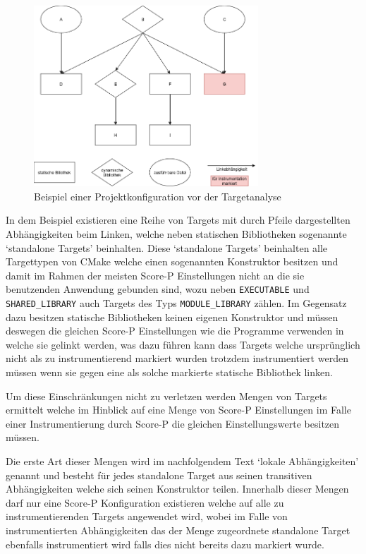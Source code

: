 \documentclass[german,proseminar,hyperref,utf8,lof]{zihpub}
\begin{document}
    \begin{figure}
        \begin{center}
            \includegraphics[width=0.75\textwidth]{analysis_before.drawio.png}
            \caption{Beispiel einer Projektkonfiguration vor der Targetanalyse}
            \label{fig:analysis_before}
        \end{center}
    \end{figure}

    In dem Beispiel existieren eine Reihe von Targets mit durch Pfeile dargestellten Abhängigkeiten
    beim Linken, welche neben statischen Bibliotheken sogenannte `standalone Targets' beinhalten.
    Diese `standalone Targets' beinhalten alle Targettypen von CMake welche einen sogenannten
    Konstruktor besitzen und damit im Rahmen der meisten Score-P Einstellungen nicht an die
    sie benutzenden Anwendung gebunden sind, wozu neben \texttt{EXECUTABLE} und \texttt{SHARED\_LIBRARY}
    auch Targets des Typs \texttt{MODULE\_LIBRARY} zählen.
    Im Gegensatz dazu besitzen statische Bibliotheken keinen eigenen Konstruktor und müssen deswegen
    die gleichen Score-P Einstellungen wie die Programme verwenden in welche sie gelinkt werden, was
    dazu führen kann dass Targets welche ursprünglich nicht als zu instrumentierend markiert wurden
    trotzdem instrumentiert werden müssen wenn sie gegen eine als solche markierte statische
    Bibliothek linken.

    Um diese Einschränkungen nicht zu verletzen werden Mengen von Targets ermittelt welche im
    Hinblick auf eine Menge von Score-P Einstellungen im Falle einer Instrumentierung durch
    Score-P die gleichen Einstellungswerte besitzen müssen.

    Die erste Art dieser Mengen wird im nachfolgendem Text `lokale Abhängigkeiten' genannt und
    besteht für jedes standalone Target aus seinen transitiven Abhängigkeiten welche sich
    seinen Konstruktor teilen.
    Innerhalb dieser Mengen darf nur eine Score-P Konfiguration existieren welche auf alle zu
    instrumentierenden Targets angewendet wird, wobei im Falle von instrumentierten Abhängigkeiten
    das der Menge zugeordnete standalone Target ebenfalls instrumentiert wird falls dies nicht
    bereits dazu markiert wurde.
\end{document}
